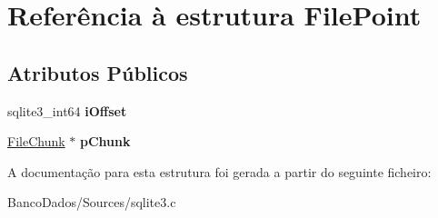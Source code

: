 \hypertarget{struct_file_point}{\section{Referência à estrutura File\-Point}
\label{struct_file_point}
}
\subsection*{Atributos Públicos}
\begin{DoxyCompactItemize}
\item 
\hypertarget{struct_file_point_a00a345e479cd37ebeb9e6ed475eb4112}{sqlite3\-\_\-int64 {\bfseries i\-Offset}}\label{struct_file_point_a00a345e479cd37ebeb9e6ed475eb4112}

\item 
\hypertarget{struct_file_point_aa17216d9d2559f14a00a2c72a8959298}{\hyperlink{struct_file_chunk}{File\-Chunk} $\ast$ {\bfseries p\-Chunk}}\label{struct_file_point_aa17216d9d2559f14a00a2c72a8959298}

\end{DoxyCompactItemize}


A documentação para esta estrutura foi gerada a partir do seguinte ficheiro\-:\begin{DoxyCompactItemize}
\item 
Banco\-Dados/\-Sources/sqlite3.\-c\end{DoxyCompactItemize}
